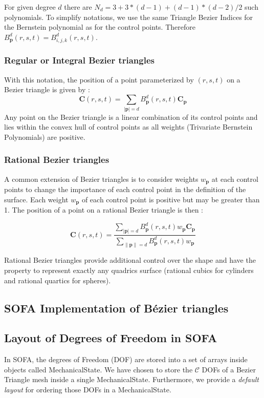 \documentclass[a4paper,11pt]{article}
\newcommand{\Bezier}{{B{\'e}zier }}
\newcommand{\controls}{{\mathcal C}}
\newcommand{\control}{{\mathbf C}}
\newcommand{\degree}{{d}}
\begin{document}
For given degree $d$ there are $N_d=3+3*(\degree-1)+(\degree-1)*(\degree-2)/2$ such polynomials. To simplify notations, we use the same Triangle Bezier Indices for the Bernstein polynomial as for the control points. Therefore $B^d_{\mathbf p}(r,s,t)=B^d_{i,j,k}(r,s,t)$.

\subsubsection{Regular or Integral Bezier triangles}

With this notation, the position of a point parameterized by $(r,s,t)$ on a Bezier triangle is given by :
\[
\control(r,s,t)=\sum_{|\mathbf p|=\degree}  B^d_{\mathbf p}(r,s,t) \control_{\mathbf p}
\]
Any point on the Bezier triangle is a linear combination of its control points and lies within the convex hull of control points as all weights (Trivariate Bernstein Polynomials) are positive.

\subsubsection{Rational Bezier triangles}
A common extension of Bezier triangles is to consider weights $w_{\mathbf p}$ at each control points to change the importance of each control point in the definition of the surface. Each weight  $w_{\mathbf p}$ of each control point is positive but may be greater than 1. 
The position of a point on a rational Bezier triangle is then :

\[
\control(r,s,t)=\frac{\sum_{|\mathbf p|=\degree}  B^d_{\mathbf p}(r,s,t) w_{\mathbf p} \control_{\mathbf p}}{\sum_{\|\mathbf p\|=\degree}  B^d_{\mathbf p}(r,s,t) w_{\mathbf p}}
\]

Rational Bezier triangles provide additional control over the shape and have the property to represent exactly any quadrics surface (rational cubics for cylinders and rational quartics for spheres).

\subsection{SOFA Implementation of \Bezier triangles}

\subsection{Layout of Degrees of Freedom in SOFA}

In SOFA, the degrees of Freedom (DOF) are stored into a set of arrays inside objects called MechanicalState.
We have chosen to store the $\controls$ DOFs of a Bezier Triangle mesh inside a single MechanicalState. Furthermore, we provide a {\em default layout} for 
ordering those  DOFs in a MechanicalState.
 
\end{document}
